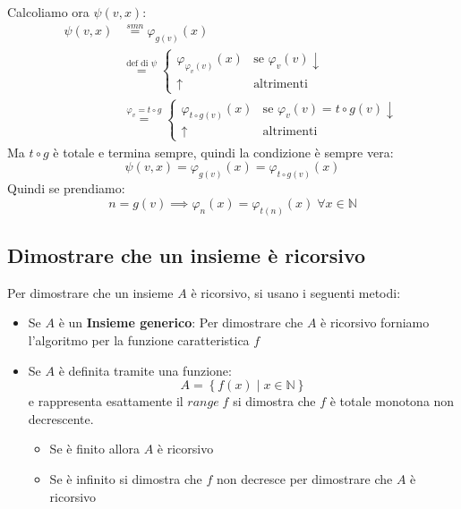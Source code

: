 \documentclass[a4paper]{article}
\begin{document}
\begin{theorem}
  \vspace{1em}
  \noindent
  Calcoliamo ora \( \psi(v, x) \):
  \[
    \begin{aligned}
      \psi(v, x) &\stackrel{smn}{=} \varphi_{g(v)}(x)\\
                 &\stackrel{\text{def di } \psi}{=}
                 \begin{cases}
                    \varphi_{\varphi_v(v)}(x) & \text{se } \varphi_v(v) \downarrow \\
                    \uparrow & \text{altrimenti}
                 \end{cases}\\
                 &\stackrel{\varphi_v = t \circ g}{=}
                 \begin{cases}
                   \varphi_{t \circ g(v)}(x) & \text{se } \varphi_v(v) = t \circ g(v) \downarrow \\
                    \uparrow & \text{altrimenti}
                 \end{cases}
    \end{aligned}
  \] 
  Ma \( t \circ g \) è totale e termina sempre, quindi la condizione è sempre vera:
  \[
    \psi(v, x) = \varphi_{g(v)}(x) = \varphi_{t \circ g(v)}(x)
  \] 
  Quindi se prendiamo:
  \[
    n = g(v) \implies \varphi_n(x) = \varphi_{t(n)}(x) \; \forall x \in \mathbb{N}
  \] 
\end{theorem}

\subsection{Dimostrare che un insieme è ricorsivo}
Per dimostrare che un insieme \( A \) è ricorsivo, si usano i seguenti metodi:
\begin{itemize}
  \item Se \( A \) è un \textbf{Insieme generico}: Per dimostrare che \( A \) è ricorsivo forniamo l'algoritmo per
    la funzione caratteristica \( f \) 

  \item Se \( A \) è definita tramite una funzione:
    \[
      A = \left\{\left. f(x) \;\right|\; x \in \mathbb{N} \right\}
    \] e rappresenta esattamente il \( range\;f \) si dimostra che \( f \) è totale monotona non decrescente.
    \begin{itemize}
      \item Se è finito allora \( A \) è ricorsivo
      \item Se è infinito si dimostra che \( f \) non decresce per dimostrare che \( A \) è ricorsivo
    \end{itemize}
\end{itemize}
\end{document}
